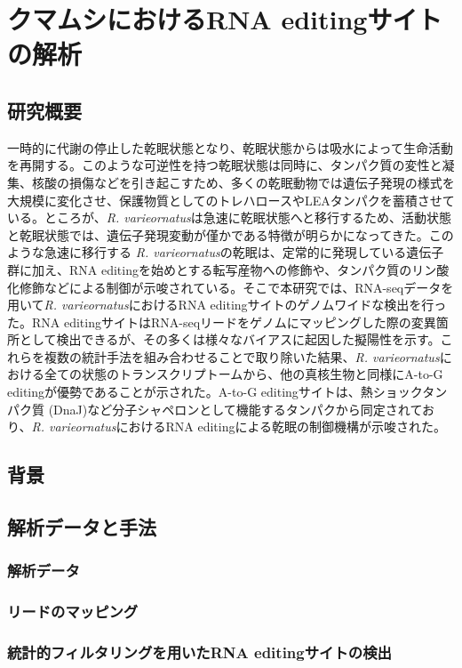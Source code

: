 \chapter{クマムシにおけるRNA editingサイトの解析}

\section{研究概要}
一時的に代謝の停止した乾眠状態となり、乾眠状態からは吸水によって生命活動を再開する。このような可逆性を持つ乾眠状態は同時に、タンパク質の変性と凝集、核酸の損傷などを引き起こすため、多くの乾眠動物では遺伝子発現の様式を大規模に変化させ、保護物質としてのトレハロースやLEAタンパクを蓄積させている。ところが、{\it R. varieornatus}は急速に乾眠状態へと移行するため、活動状態と乾眠状態では、遺伝子発現変動が僅かである特徴が明らかになってきた。このような急速に移行する {\it R. varieornatus}の乾眠は、定常的に発現している遺伝子群に加え、RNA editingを始めとする転写産物への修飾や、タンパク質のリン酸化修飾などによる制御が示唆されている。そこで本研究では、RNA-seqデータを用いて{\it R. varieornatus}におけるRNA editingサイトのゲノムワイドな検出を行った。RNA editingサイトはRNA-seqリードをゲノムにマッピングした際の変異箇所として検出できるが、その多くは様々なバイアスに起因した擬陽性を示す。これらを複数の統計手法を組み合わせることで取り除いた結果、{\it R. varieornatus}における全ての状態のトランスクリプトームから、他の真核生物と同様にA-to-G editingが優勢であることが示された。A-to-G editingサイトは、熱ショックタンパク質 (DnaJ)など分子シャペロンとして機能するタンパクから同定されており、{\it R. varieornatus}におけるRNA editingによる乾眠の制御機構が示唆された。

\section{背景}
\section{解析データと手法}
\subsection{解析データ}
\subsection{リードのマッピング}
\subsection{統計的フィルタリングを用いたRNA editingサイトの検出}
